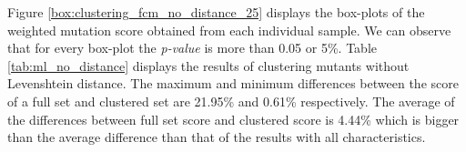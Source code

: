 \documentclass[../../main]{subfiles}
\begin{document}
Figure \ref{box:clustering_fcm_no_distance_25} displays the box-plots of the weighted mutation score obtained from each individual sample. 
We can observe that for every box-plot the \textit{p-value} is more than 0.05 or 5\%.
Table \ref{tab:ml_no_distance} displays the results of clustering mutants without Levenshtein distance.
The maximum and minimum differences between the score of a full set and clustered set are 21.95\% and 0.61\% respectively.
The average of the differences between full set score and clustered score is 4.44\% which is bigger than the average difference than that of the results with all characteristics.
\end{document}
